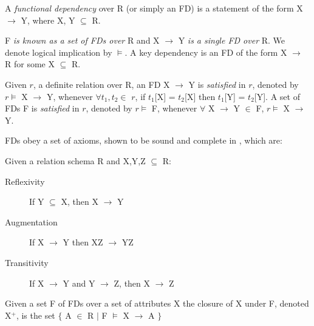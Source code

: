 \begin{definition}
\begin{rm}
A {\em functional dependency} over R (or simply an FD)
is a statement of the form X $\to$ Y, where X, Y $\subseteq$ R.
\end{rm}
\end{definition}
\medskip
 
 F {\em is known as a set of FDs over} R and X $\to$ Y 
{\em is  a single FD over} R. We denote logical implication by $\models$.
A key dependency is an FD of the form X $\to$ R for some X $\subseteq$
R. 
\begin{definition}[Satisfaction of an FD]\label{def:sat}
\begin{rm}
Given $r$,  a definite relation over R,
an FD X $\to$ Y is {\em satisfied} in $r$,
denoted by $r \models$ X $\to$ Y, whenever
$\forall t_1, t_2 \in$ $r$, if $t_1$[X] = $t_2$[X] then $t_1$[Y] = $t_2$[Y].
A set of FDs F is {\em satisfied} in $r$,
denoted by $r \models$ F, whenever
$\forall$ X $\to$ Y $\in$ F, $r \models$ X $\to$ Y.
\end{rm}
\end{definition}
\medskip
{}
FDs obey a set of axioms, shown to be sound and complete in
\cite{Arms74}, which are:
\begin{definition}
\begin{rm}
Given a relation schema R and X,Y,Z $\subseteq$ R:
{\line
\begin{description}
\item[Reflexivity] If Y $\subseteq$ X, then X $\to$ Y
\item[Augmentation] If X $\to$ Y then XZ $\to$ YZ
\item[Transitivity] If X $\to$ Y and Y $\to$ Z, then X $\to$ Z
\end{description}
}
\end{rm}
\end{definition}



\begin{definition}
\begin{rm}
Given a set F of FDs over a set of attributes X the closure of X
under F, denoted X$^+$, is the set $\{$ A $\in$ R $\mid$ F $\models$ X $\to$ A $\}$
\end{rm}
\end{definition}

